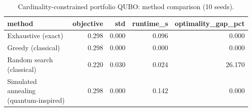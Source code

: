 \begin{table}
\caption{Cardinality-constrained portfolio QUBO: method comparison (10 seeds).}
\label{tab:benchmark}
\begin{tabular}{lrrrr}
\toprule
method & objective & std & runtime\_s & optimality\_gap\_pct \\
\midrule
Exhaustive (exact) & 0.298 & 0.000 & 0.096 & 0.000 \\
Greedy (classical) & 0.298 & 0.000 & 0.000 & 0.000 \\
Random search (classical) & 0.220 & 0.030 & 0.024 & 26.170 \\
Simulated annealing (quantum-inspired) & 0.298 & 0.000 & 0.142 & 0.000 \\
\bottomrule
\end{tabular}
\end{table}
